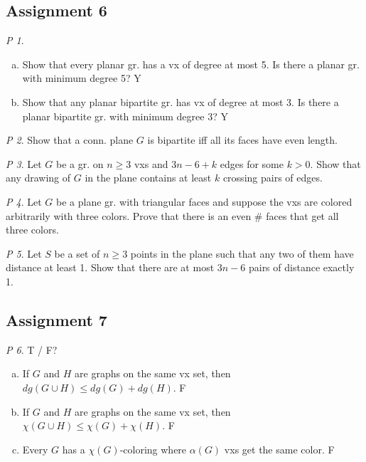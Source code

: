 \documentclass[11pt, fleqn, a4paper, landscape]{article}
\theoremstyle{plain} %
\theoremstyle{remark} %
\newtheorem{problem}{P}
\theoremstyle{definition} %
\begin{document}
\begin{multicols}{5}
\subsection{Assignment 6}

\addtocounter{problem}{1}

\begin{problem}
\begin{enumerate}[(a)]
\item Show that every planar gr. has a vx of degree at most 5. Is there a planar gr. with minimum degree 5? Y
\item Show that any planar bipartite gr. has vx of degree at most 3. Is there a planar bipartite gr. with minimum degree 3? Y
\end{enumerate}
\end{problem}

\begin{problem}
Show that a conn. plane $G$ is bipartite iff all its faces have even length.
\end{problem}

\begin{problem}
Let $G$ be a gr. on $n\ge 3$ vxs and $3n- 6 + k$ edges for some $k > 0$. Show that any drawing of $G$ in the plane contains at least $k$ crossing pairs of edges.
\end{problem}

\begin{problem}
Let $G$ be a plane gr. with triangular faces and suppose the vxs are colored arbitrarily with three colors. Prove that there is an even \# faces that get all three colors.
\end{problem}

\begin{problem}
Let $S$ be a set of $n\ge 3$ points in the plane such that any two of them have distance at least 1. Show that there are at most $3n - 6$ pairs of distance exactly 1.
\end{problem}

\subsection{Assignment 7}

\begin{problem}
T / F?
\begin{enumerate}[(a)]
\item If $G$ and $H$ are graphs on the same vx set, then $dg(G \cup H)\le dg(G) + dg(H)$. F
\item If $G$ and $H$ are graphs on the same vx set, then $\chi(G \cup H) \le \chi(G) + \chi(H)$. F
\item Every $G$ has a $\chi(G)$-coloring where $\alpha(G)$ vxs get the same color. F
\end{enumerate}
\end{problem}


\end{multicols}
\end{document}
